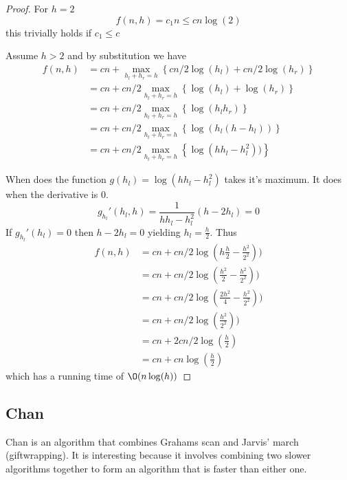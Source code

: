 \documentclass[10pt]{article}
\begin{document}
\begin{proof}

  For $h=2$                
  \begin{equation}
    f(n,h) = c_1n \leq cn\log(2)
  \end{equation}
  this trivially holds if $c_1 \leq c$
  
  Assume $h>2$ and by substitution we have
  \begin{align*}
   f(n,h) &= cn + \max_{h_l+h_r = h}\left\{cn/2\log(h_l)+cn/2\log(h_r)\right\} \\
          &= cn + cn/2\max_{h_l+h_r = h}\left\{\log(h_l)+\log(h_r)\right\} \\
          &= cn + cn/2\max_{h_l+h_r = h}\left\{\log(h_lh_r)\right\} \\          
          &= cn + cn/2\max_{h_l+h_r = h}\left\{\log(h_l(h-h_l))\right\} \\         
          &= cn + cn/2\max_{h_l+h_r = h}\left\{\log(hh_l-h_l^2))\right\}                    
  \end{align*}
    
  When does the function $g(h_l) = \log(hh_l-h_l^2)$ takes it's maximum. It does when the derivative is $0$.
  \begin{equation}
    g_{h_l}'(h_l,h) = \frac{1}{hh_l-h_l^2} (h-2h_l) = 0 
  \end{equation}
  If $g_{h_l}'(h_l)=0$ then $h-2h_l=0$ yielding $h_l = \frac{h}{2}$. Thus
  \begin{align*}
   f(n,h) &= cn + cn/2\log(h\frac{h}{2}-\frac{h^2}{2^2})) \\
          &= cn + cn/2\log(\frac{h^2}{2}-\frac{h^2}{2^2})) \\   
          &= cn + cn/2\log(\frac{2h^2}{4}-\frac{h^2}{2^2})) \\
          &= cn + cn/2\log(\frac{h^2}{2^2})) \\                       
          &= cn + 2cn/2\log(\frac{h}{2}) \\                                 
          &= cn + cn\log(\frac{h}{2})                                 
  \end{align*}
   which has a running time of $\O(n\log(h))$
   
\end{proof}



\subsection{Chan} %
\label{sub:chan_and_relations_to_mbc}
Chan is an algorithm that combines Grahams scan and Jarvis' march (giftwrapping). It is interesting because it involves combining two slower algorithms together to form an algorithm that is faster than either one.
\end{document}
